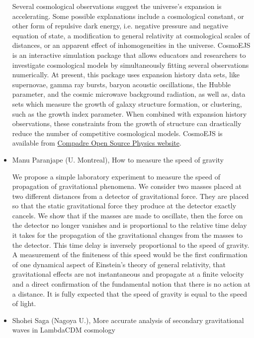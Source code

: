 \documentclass[letterpaper,12pt]{article}
\newcommand{\talk}[2]{{\fontspec{Lato Bold} #1,} {\fontspec{Lato Light Italic} #2}}
\begin{document}
\begin{itemize}
Several cosmological observations suggest the universe’s expansion is accelerating. Some possible explanations include a cosmological constant, or other form of repulsive dark energy, i.e. negative pressure and negative equation of state, a modification to general relativity at cosmological scales of distances, or an apparent effect of inhomogeneities in the universe.  CosmoEJS is an interactive simulation package that allows educators and researchers to investigate cosmological models by simultaneously fitting several observations numerically.  At present, this package uses expansion history data sets, like supernovae, gamma ray bursts, baryon acoustic oscillations, the Hubble parameter, and the cosmic microwave background radiation, as well as, data sets which measure the growth of galaxy structure formation, or clustering, such as the growth index parameter.  When combined with expansion history observations, these constraints from the growth of structure can drastically reduce the number of competitive cosmological models. CosmoEJS is available from \href{http://www.compadre.org/osp/items/detail.cfm?ID=12406}{Compadre Open Source Physics website}.


\item \talk{Manu Paranjape (U. Montreal)}{How to measure the speed of gravity}

We propose a simple laboratory experiment to measure the speed of propagation of gravitational phenomena. We consider two masses placed at two different distances from a detector of gravitational force. They are placed so that the static gravitational force they produce at the detector exactly cancels. We show that if the masses are made to oscillate, then the force on the detector no longer vanishes and is proportional to the relative time delay it takes for the propagation of the gravitational changes from the masses to the detector. This time delay is inversely proportional to the speed of gravity. A measurement of the finiteness of this speed would be the first confirmation of one dynamical aspect of Einstein's theory of general relativity, that gravitational effects are not instantaneous and propagate at a finite velocity and a direct confirmation of the fundamental notion that there is no action at a distance. It is fully expected that the speed of gravity is equal to the speed of light. 

\item \talk{Shohei Saga (Nagoya U.)}{More accurate analysis of secondary gravitational waves in LambdaCDM cosmology}


\end{itemize}
\end{document}
